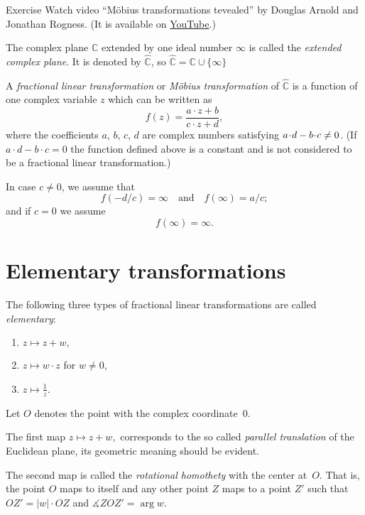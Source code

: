 \begin{thm}{Exercise}\label{ex:movie}
Watch video ``M\"obius transformations tevealed'' by Douglas Arnold and Jonathan Rogness.
(It is available on \href{http://youtu.be/JX3VmDgiFnY}{YouTube}.)
\end{thm}


The complex plane $\mathbb{C}$ extended by one ideal number $\infty$ 
is called the \emph{extended complex plane}.
It is denoted by $\hat{\mathbb{C}}$, so $\hat{\mathbb{C}}=\mathbb{C}\cup\{\infty\}$

A \emph{fractional linear transformation} or \emph{M\"obius transformation} of  $\hat{\mathbb{C}}$ is a function of one complex variable $z$
which can be written as
$$f(z) = \frac{a\cdot z + b}{c\cdot z + d},$$
where the coefficients $a$, $b$, $c$, $d$ are complex numbers satisfying $a\cdot d \z- b\cdot c \not= 0$.
(If $a\cdot d - b\cdot c = 0$ the function defined above is a constant and is not considered to be a fractional linear transformation.) 

In case $c\not=0$, we assume that
$$f(-d/c) = \infty
\quad
\text{and}
\quad
f(\infty) = a/c;$$
and if $c=0$ we assume
$$f(\infty) = \infty.$$





\section*{Elementary transformations}

The following three types of fractional linear transformations are called \emph{elementary}:
\begin{enumerate}
\item $z\mapsto z+w,$
\item $z\mapsto w\cdot z$ for $w\ne0,$
\item $z\mapsto \frac1z.$
\end{enumerate}
 
Let $O$ denotes the point with the complex coordinate~$0$.

The first map $z\mapsto z+w,$ corresponds to the so called 
\emph{parallel translation} 
of the Euclidean plane, its geometric meaning should be evident.

The second map is called the \emph{rotational homothety} with the center at~$O$.
That is, the point $O$ maps to itself
and any other point $Z$ maps to a point $Z'$ such that $OZ'=|w|\cdot OZ$ and $\measuredangle ZOZ'=\arg w$.

